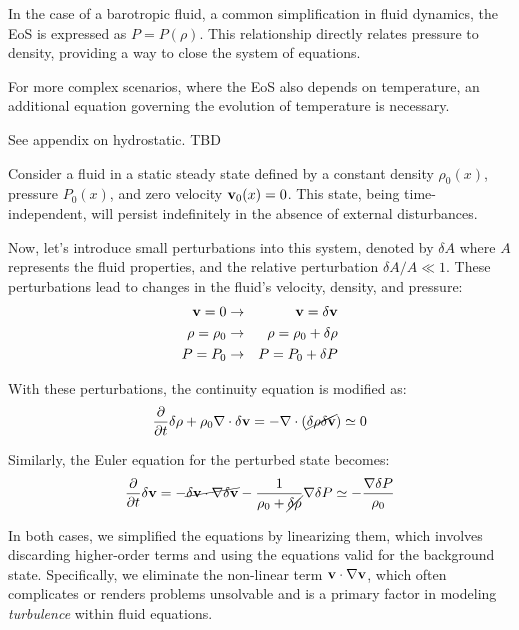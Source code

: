 In the case of a barotropic fluid, a common simplification in fluid dynamics, the EoS is expressed as \( P=P(\rho) \). This relationship directly relates pressure to density, providing a way to close the system of equations.

For more complex scenarios, where the EoS also depends on temperature, an additional equation governing the evolution of temperature is necessary. 

{\color{red}See appendix on hydrostatic. TBD}

Consider a fluid in a static steady state defined by a constant density \( \rho_0(x) \), pressure \( P_0(x) \), and zero velocity \( \vb v_0(x) = 0 \). This state, being time-independent, will persist indefinitely in the absence of external disturbances.

Now, let's introduce small perturbations into this system, denoted by \( \delta A \) where \( A \) represents the fluid properties, and the relative perturbation \( \delta A / A \ll 1 \). 
%
These perturbations lead to changes in the fluid's velocity, density, and pressure:
%
\begin{eqnarray}
\vb v = 0 & \rightarrow & \vb v = \delta \vb v \\
\rho = \rho_0 & \rightarrow & \rho = \rho_0 + \delta \rho \\
P = P_0 & \rightarrow & P = P_0 + \delta P
\end{eqnarray}

With these perturbations, the continuity equation is modified as:
%
\begin{equation}
\frac{\partial}{\partial t} \delta \rho + \rho_0 \nabla \cdot \delta \vb v = - \nabla \cdot ( \cancel{\delta \rho \delta \vb v}) \simeq 0
\end{equation}

Similarly, the Euler equation for the perturbed state becomes:
%
\begin{equation}
\frac{\partial}{\partial t} \delta \vb v = -\cancel{\delta \vb v \cdot \nabla \delta \vb v} - \frac{1}{\rho_0 + \cancel{\delta \rho}} \nabla \delta P \simeq - \frac{\nabla \delta P}{\rho_0} 
\end{equation}

In both cases, we simplified the equations by linearizing them, which involves discarding higher-order terms and using the equations valid for the background state. Specifically, we eliminate the non-linear term \( \vb v \cdot \nabla \vb v \), which often complicates or renders problems unsolvable and is a primary factor in modeling \emph{turbulence} within fluid equations.

